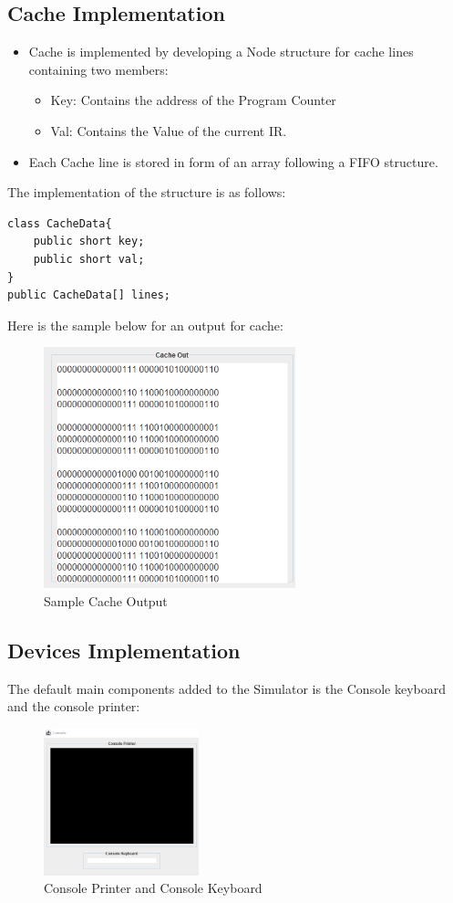 \documentclass[10pt]{article}
\begin{document}
\subsection{Cache Implementation}
\begin{itemize}
  \item Cache is implemented by developing a Node structure for cache lines containing two
  members:
  \begin{itemize}[label=--]
    \item Key: Contains the address of the Program Counter
    \item Val: Contains the Value of the current IR.
  \end{itemize}
  \item Each Cache line is stored in form of an array following a FIFO structure.
\end{itemize}
The implementation of the structure is as follows:
\begin{lstlisting}[caption={Cache Struct Implementation Code}]
class CacheData{
    public short key;
    public short val;
}
public CacheData[] lines;
\end{lstlisting}
Here is the sample below for an output for cache:
\begin{figure}[H]
  \centering
  \includegraphics[width=0.65\textwidth]{Pics/Fig14.png}
  \caption{Sample Cache Output}
  \label{fig:Cache Output}
\end{figure}
\subsection{Devices Implementation}
The default main components added to the Simulator is the Console keyboard and the console printer:
\begin{figure}[H]
  \centering
  \includegraphics[width=0.4\textwidth]{Pics/Fig15.png}
  \caption{Console Printer and Console Keyboard}
  \label{fig:ConsolePrinterKeyboard}
\end{figure}
\end{document}
